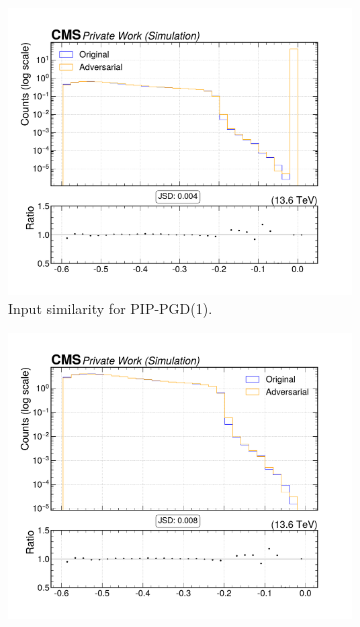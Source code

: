 \begin{figure}[htbp]
  \centering
  \begin{subfigure}[t]{0.32\textwidth}
    \includegraphics[width=\linewidth]{media/output/features/compare/combined_it_1/cmp_npf_arr_Npfcan_deltaR.pdf}
    \caption*{Input similarity for PIP-PGD(1).}
  \end{subfigure}\hfill
  \begin{subfigure}[t]{0.32\textwidth}
    \includegraphics[width=\linewidth]{media/output/features/compare/combined_it_2/cmp_npf_arr_Npfcan_deltaR.pdf}

\end{subfigure}
\end{figure}

